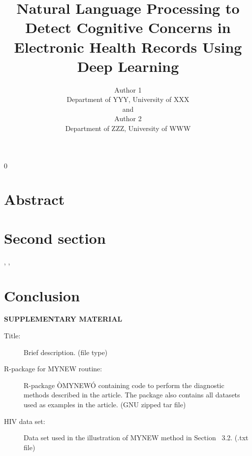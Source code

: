 \documentclass[12pt]{article}
\newcommand{\blind}{0}
\begin{document}
\blind {
    \title {
        \bf Natural Language Processing to Detect Cognitive Concerns in Electronic Health Records Using Deep Learning
    }
    
    \author {
        Author 1 \\
        Department of YYY, University of XXX\\
        and \\
        Author 2 \\
        Department of ZZZ, University of WWW
    }
    
    \maketitle
} \fi

\newpage
    \tableofcontents
\newpage

\section{Abstract}



\section{Second section}








\cite{Campbell02}, \cite{Schubert13}, \cite{Chi81}



\section{Conclusion}
\label{sec:conc}


\bigskip
\begin{center}
{\large\bf SUPPLEMENTARY MATERIAL}
\end{center}

\begin{description}

\item[Title:] Brief description. (file type)

\item[R-package for  MYNEW routine:] R-package ÒMYNEWÓ containing code to perform the diagnostic methods described in the article. The package also contains all datasets used as examples in the article. (GNU zipped tar file)

\item[HIV data set:] Data set used in the illustration of MYNEW method in Section~ 3.2. (.txt file)

\end{description}

%

%

\begin{thebibliography}{}

\end{thebibliography}
\end{document}
